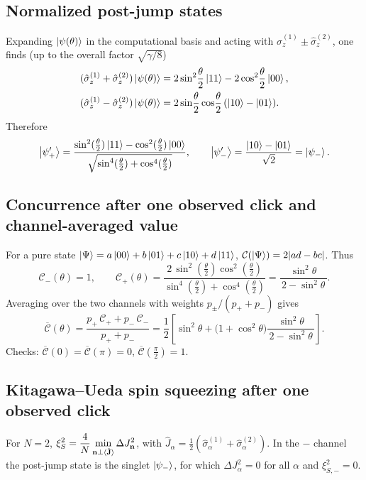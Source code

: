 \documentclass[12pt,a4paper]{article}
\begin{document}
\subsection*{Normalized post-jump states}

Expanding \(\ket{\psi(\theta)}\) in the computational basis and acting with
\(\hat\sigma_z^{(1)}\pm \hat\sigma_z^{(2)}\), one finds (up to the overall factor \(\sqrt{\gamma/8}\))
\begin{align*}
	(\hat\sigma_z^{(1)}+\hat\sigma_z^{(2)})\ket{\psi(\theta)}
	&=2\sin^2\!\frac{\theta}{2}\ket{11}-2\cos^2\!\frac{\theta}{2}\ket{00},\\
	(\hat\sigma_z^{(1)}-\hat\sigma_z^{(2)})\ket{\psi(\theta)}
	&=2\sin\!\frac{\theta}{2}\cos\!\frac{\theta}{2}\,(\ket{10}-\ket{01}).
\end{align*}
Therefore
\[
\ket{\psi_+'}=
\frac{\sin^2(\tfrac{\theta}{2})\ket{11}-\cos^2(\tfrac{\theta}{2})\ket{00}}
{\sqrt{\sin^4(\tfrac{\theta}{2})+\cos^4(\tfrac{\theta}{2})}},
\qquad
\ket{\psi_-'}=\frac{\ket{10}-\ket{01}}{\sqrt{2}}=\ket{\psi_-}.
\]

\subsection*{Concurrence after one observed click and channel-averaged value}

For a pure state \(\ket{\Psi}=a\ket{00}+b\ket{01}+c\ket{10}+d\ket{11}\),
\(\mathcal C(\ket{\Psi})=2|ad-bc|\).
Thus
\[
\mathcal C_-(\theta)=1,\qquad
\mathcal C_+(\theta)=\frac{2\,\sin^2(\tfrac{\theta}{2})\cos^2(\tfrac{\theta}{2})}
{\sin^4(\tfrac{\theta}{2})+\cos^4(\tfrac{\theta}{2})}
=\frac{\sin^2\theta}{\,2-\sin^2\theta\,}.
\]
Averaging over the two channels with weights \(p_\pm/(p_++p_-)\) gives
\[
\boxed{\;
	\overline{\mathcal C}(\theta)=
	\frac{p_+\,\mathcal C_+ + p_-\,\mathcal C_-}{p_++p_-}
	=\frac{1}{2}\left[
	\sin^2\theta+\big(1+\cos^2\theta\big)\frac{\sin^2\theta}{\,2-\sin^2\theta\,}
	\right].\;}
\]
Checks: \(\overline{\mathcal C}(0)=\overline{\mathcal C}(\pi)=0\), \(\overline{\mathcal C}(\tfrac{\pi}{2})=1\).

\subsection*{Kitagawa--Ueda spin squeezing after one observed click}

For \(N=2\), \(\displaystyle \xi_S^2=\frac{4}{N}\min_{\mathbf n\perp \expval*{\hat{\mathbf J}}}\Delta J_{\mathbf n}^2\),
with \(\hat J_\alpha=\tfrac{1}{2}(\hat\sigma_\alpha^{(1)}+\hat\sigma_\alpha^{(2)})\).
In the \(-\) channel the post-jump state is the singlet \(\ket{\psi_-}\), for which
\(\Delta J_\alpha^2=0\) for all \(\alpha\) and \(\xi_{S,-}^2=0\).
\end{document}
